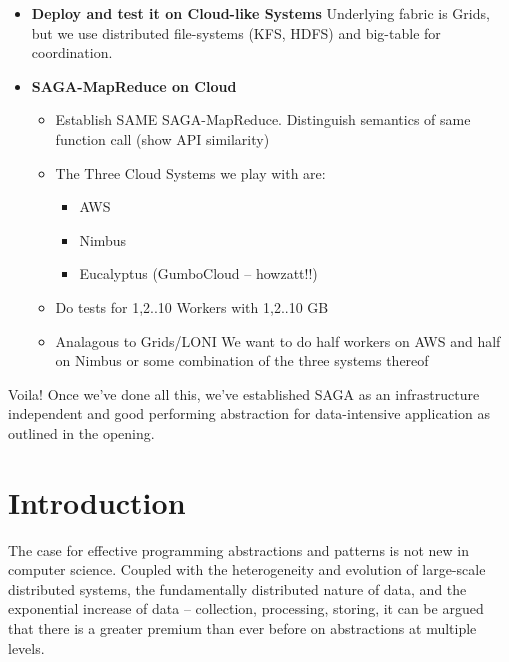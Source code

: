 \documentclass[conference,final]{IEEEtran}
\begin{document}
{\begin{itemize}
\item {\bf Deploy and test it on Cloud-like Systems} Underlying fabric
  is Grids, but we use distributed file-systems (KFS, HDFS) and
  big-table for coordination.
\item {\bf SAGA-MapReduce on Cloud}
  \begin{itemize}
  \item Establish SAME SAGA-MapReduce. Distinguish semantics of same
    function call (show API similarity)
  \item The Three Cloud Systems we play with are:
    \begin{itemize}
    \item AWS
    \item Nimbus
    \item Eucalyptus (GumboCloud -- howzatt!!)
    \end{itemize}
  \item Do tests for 1,2..10 Workers with 1,2..10 GB
  \item Analagous to Grids/LONI We want to do half workers on AWS and
    half on Nimbus or some combination of the three systems thereof
  \end{itemize}
\end{itemize}

Voila! Once we've done all this, we've established SAGA as an
infrastructure independent and good performing abstraction for
data-intensive application as outlined in the opening.}
\section{Introduction} 

The case for effective programming abstractions and patterns is not
new in computer science.  Coupled with the heterogeneity and evolution
of large-scale distributed systems, the fundamentally distributed
nature of data, and the exponential increase of data -- collection,
processing, storing, it can be argued that there is a greater premium
than ever before on abstractions at multiple levels.

\end{document}
